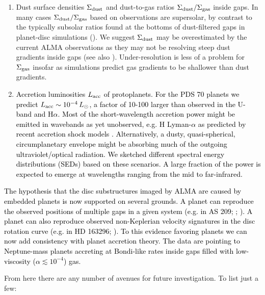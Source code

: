 \documentclass[fleqn,usenatbib]{mnras}
\newcommand{\nick}[1]{\textcolor{black}{ #1}}
\newcommand{\Sigg}{\Sigma_{\rm gas}}
\newcommand{\Sigd}{\Sigma_{\rm dust}}
\begin{document}
\begin{enumerate}
\item Dust surface densities $\Sigd$ and dust-to-gas ratios $\Sigd/\Sigg$ inside gaps. In many cases $\Sigd/\Sigg$ based  on observations are supersolar, by contrast to the typically subsolar ratios found at the bottoms of dust-filtered gaps in planet-disc simulations (\citealt{dong_etal_2017}). We suggest $\Sigd$ may be overestimated by the current ALMA observations as they may not be resolving steep dust gradients inside gaps (see also \citealt{jennings_etal_2021}). Under-resolution is less of a problem for $\Sigg$ insofar as simulations predict gas gradients to be shallower than dust gradients.
\item \nick{Accretion luminosities $L_{\rm acc}$ of protoplanets. For the PDS 70 planets we predict $L_{\rm acc} \sim 10^{-4}\,L_{\odot}$, a factor of 10-100 larger than observed in the U-band and H$\alpha$. Most of the short-wavelength accretion power might 
be emitted in wavebands as yet unobserved, e.g. H Lyman-$\alpha$  as predicted by recent accretion shock models \citep{aoyama_etal_2021}. Alternatively, a dusty, quasi-spherical, circumplanetary  envelope might
be absorbing 
much 
of the outgoing ultraviolet/optical radiation. We sketched different spectral
energy distributions (SEDs)
based on these scenarios. A large fraction of the power is expected to emerge at wavelengths ranging from the mid to far-infrared.}

\end{enumerate}

\nick{The hypothesis that the disc 
substructures imaged by ALMA are 
caused by embedded planets is now supported on several grounds.
A planet can reproduce the observed positions of multiple gaps in a given system (e.g. in AS 209; \citealt{dong_etal_2017, dong_etal_2018}; \citealt{zhang_etal_2018}). A planet can also reproduce observed  non-Keplerian velocity signatures in the disc rotation curve (e.g. in HD 163296; \citealt{teague_etal_2018, teague_etal_2021, pinte_etal_2020}). To this  evidence favoring planets we can now add 
consistency with planet accretion theory. The data are pointing to Neptune-mass planets accreting at Bondi-like rates inside %
gaps filled with low-viscosity ($\alpha \lesssim 10^{-4}$) gas.}


From here there are any number of avenues for future investigation. To list just a few:
\end{document}
